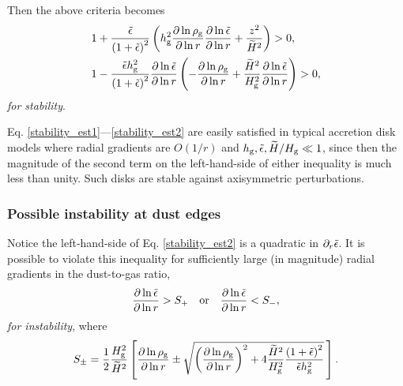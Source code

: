 Then the above criteria becomes
\begin{align}
  &1 + \frac{\tilde{\epsilon}}{\left(1+
    \tilde{\epsilon}\right)^2}\left(h_\mathrm{g}^2\frac{\partial\ln{\rho_\mathrm{g}}}{\partial\ln{r}}
  \frac{\partial\ln{\tilde{\epsilon}}}{\partial\ln{r}} + 
  \frac{z^2}{\widetilde{H}^2}\right)>0 \label{stability_est1},   \\ 
&1 - \frac{\tilde{\epsilon}
  h_\mathrm{g}^2}{\left(1+\tilde{\epsilon}\right)^2}
  \frac{\partial\ln{\tilde{\epsilon}}}{\partial\ln{r}}\left(-\frac{\partial\ln{\rho_\mathrm{g}}}{\partial\ln{r}}+\frac{\widetilde{H}^2}{H_\mathrm{g}^2}\frac{\partial\ln{\tilde{\epsilon}}}{\partial\ln{r}}\right)
  > 0 \label{stability_est2},
\end{align}
\emph{for stability}. 

Eq. \ref{stability_est1}---\ref{stability_est2} are easily satisfied
in typical accretion disk models where radial gradients are $O(1/r)$ and
$h_\mathrm{g},\tilde{\epsilon}, \widetilde{H}/H_\mathrm{g}\ll 1$, since then the
magnitude of the second term on the left-hand-side  of either
inequality is much less than unity. Such disks are stable against
axisymmetric perturbations.  

\subsubsection{Possible instability at dust edges}
Notice the left-hand-side of Eq. \ref{stability_est2} is a quadratic in
$\partial_r\tilde{\epsilon}$. It is possible to
violate this inequality for sufficiently large (in magnitude) radial
gradients  in the dust-to-gas ratio, 
\begin{align}
  \frac{\partial\ln{\tilde{\epsilon}}}{\partial\ln{r}} > S_+ \quad \mathrm{or} \quad 
  \frac{\partial\ln{\tilde{\epsilon}}}{\partial\ln{r}} < S_-,
\end{align}
\emph{for instability}, where
\begin{align}\label{spm}
S_\pm = \frac{1}{2}\frac{H_\mathrm{g}^2}{\widetilde{H}^2} 
  \left[
  \frac{\partial\ln{\rho_\mathrm{g}}}{\partial\ln{r}} \pm 
  \sqrt{
  \left(\frac{\partial\ln{\rho_\mathrm{g}}}{\partial\ln{r}}\right)^2 + 
  4 \frac{\widetilde{H}^2}{H_\mathrm{g}^2}
  \frac{\left(1+\tilde{\epsilon}\right)^2}{\tilde{\epsilon} h_\mathrm{g}^2}
  }
  \,\right]. 
\end{align}


